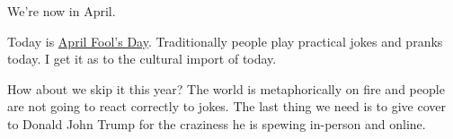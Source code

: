 We're now in April.

Today is
\href{https://simple.wikipedia.org/w/index.php?title=April_Fools\%27_Day&direction=next&oldid=9217343}{April
Fool's Day}. Traditionally people play practical jokes and pranks today.
I get it as to the cultural import of today.

How about we skip it this year? The world is metaphorically on fire and
people are not going to react correctly to jokes. The last thing we need
is to give cover to Donald John Trump for the craziness he is spewing
in-person and online.
